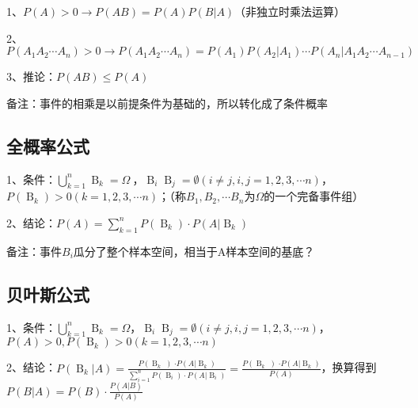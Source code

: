 1、$P(A)>0 \rightarrow P(AB)=P(A)P(B|A)$（非独立时乘法运算）

2、$P(A_1A_2\cdots A_n) > 0 \rightarrow P(A_1A_2\cdots A_n)=P(A_1)P(A_2|A_1)\cdots P(A_n|A_1A_2\cdots A_{n-1})$

3、推论：$P(AB) \le P(A)$

备注：事件的相乘是以前提条件为基础的，所以转化成了条件概率



\subsection{全概率公式}

1、条件：$\mathop{ \bigcup }\limits_{{k=1}}^{{n}}\mathop{{B}}\nolimits_{{k}}=\Omega \ $，$\mathop{{B}}\nolimits_{{i}}\mathop{{B}}\nolimits_{{j}}= \emptyset { \left( {i \neq j,i,j=1,2,3, \cdots n} \right) }$，$P{ \left( {\mathop{{B}}\nolimits_{{k}}} \right) } > 0{ \left( {k=1,2,3, \cdots n} \right) }$；（称$B_1,B_2,\cdots B_n$为$\Omega$的一个完备事件组）

2、结论：$P{ \left( {A} \right) }=\mathop{ \sum }\limits_{{k=1}}^{{n}}P{ \left( {\mathop{{B}}\nolimits_{{k}}} \right) } \cdot P{ \left( {A \left| \mathop{{B}}\nolimits_{{k}}\right. } \right) }$

备注：事件$B_i$瓜分了整个样本空间，相当于A样本空间的基底？



\subsection{贝叶斯公式}

1、条件：$\mathop{ \bigcup }\limits_{{k=1}}^{{n}}\mathop{{B}}\nolimits_{{k}}=\Omega$，$\mathop{{B}}\nolimits_{{i}}\mathop{{B}}\nolimits_{{j}}= \emptyset { \left( {i \neq j,i,j=1,2,3, \cdots n} \right) }$，$P(A) > 0,P{ \left( {\mathop{{B}}\nolimits_{{k}}} \right) } > 0{ \left( {k=1,2,3, \cdots n} \right) }$

2、结论：$P{ \left( {\mathop{{B}}\nolimits_{{k}} \left| A\right. } \right) }=\frac{{P \left( {\mathop{{B}}\nolimits_{{k}}} \left) \cdot P{ \left( {A \left| {\mathop{{B}}\nolimits_{{k}}}\right. } \right) }\right. \right. }}{{\mathop{ \sum }\limits_{{i=1}}^{{n}}P{ \left( {\mathop{{B}}\nolimits_{{i}}} \right) } \cdot P{ \left( {A \left| \mathop{{B}}\nolimits_{{i}}\right. } \right) }}}=\frac{{P \left( {\mathop{{B}}\nolimits_{{k}}} \left) \cdot P{ \left( {A \left| {\mathop{{B}}\nolimits_{{k}}}\right. } \right) }\right. \right. }}{P(A)}$，换算得到$P(B|A)=P(B)\cdot \frac{P(A|B)}{P(A)}$

